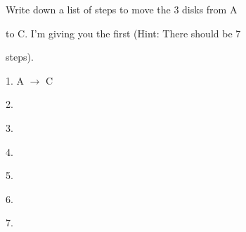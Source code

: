  Write down a list of steps to move the 3 disks from A

 to C. I'm giving you the first (Hint: There should be 7

 steps).



 1. A $\rightarrow$ C



 2.



 3.



 4.



 5.



 6.



 7.

